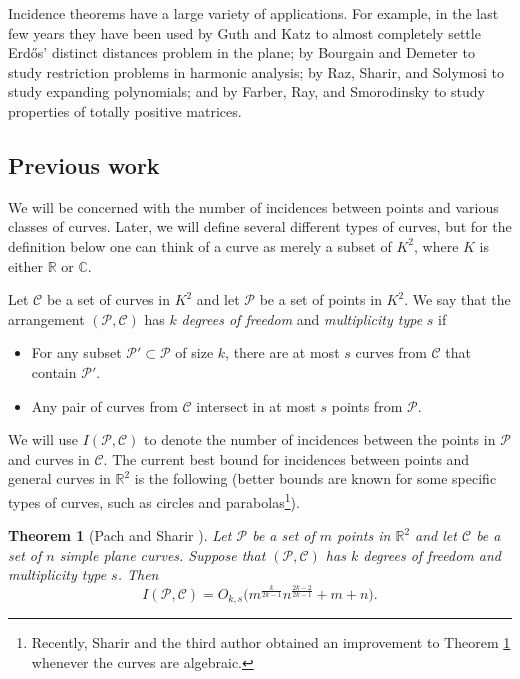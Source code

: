 \documentclass[letterpaper, reqno,11pt]{article}
\newtheorem{theorem}{Theorem}[section]
\theoremstyle{remark}
\newcommand{\RR}{\mathbb{R}}
\newcommand{\CC}{\mathbb{C}}
\newcommand{\pts}{\mathcal P}
\newcommand{\curves}{\mathcal C}
\begin{document}
Incidence theorems have a large variety of applications. For example, in the last few years they have been used by Guth and Katz \cite{Guth} to almost completely settle Erd\H os' distinct distances problem in the plane; by Bourgain and Demeter \cite{BD13,BD14} to study restriction problems in harmonic analysis; by Raz, Sharir, and Solymosi \cite{RSS14} to study expanding polynomials; and by Farber, Ray, and Smorodinsky \cite{FRS13} to study properties of totally positive matrices.

\subsection{Previous work}
We will be concerned with the number of incidences between points and various classes of curves. Later, we will define several different types of curves, but for the definition below one can think of a curve as merely a subset of $K^2$, where $K$ is either $\RR$ or $\CC$.

Let $\mathcal{C}$ be a set of curves in $K^2$ and let $\pts$ be a set of points in $K^2$. We say that the arrangement $(\pts,\mathcal{C})$ has $k$ \emph{degrees of freedom} and \emph{multiplicity type} $s$ if
\begin{itemize}
 \item For any subset $\pts'\subset\pts$ of size $k$, there are at most $s$ curves from $\curves$ that contain $\pts'$.
 \item Any pair of curves from $\curves$ intersect in at most $s$ points from $\pts$.
\end{itemize}

We will use $I(\pts,\curves)$ to denote the number of incidences between the points in $\pts$ and curves in $\curves$.
The current best bound for incidences between points and general curves in $\RR^2$ is the following (better bounds are known for some specific types of curves, such as circles and parabolas\footnote{Recently, Sharir and the third author obtained an improvement \cite{SZ} to Theorem \ref{th:PS} whenever the curves are algebraic.}).

\begin{theorem}[Pach and Sharir \cite{PS}] \label{th:PS}
Let $\pts$ be a set of $m$ points in $\RR^2$ and let $\curves$ be a set of $n$ simple plane curves. Suppose that $(\pts,\curves)$ has $k$ degrees of freedom and multiplicity type $s$. Then
\begin{equation*}
I(\pts,\curves) = O_{k,s}\big(m^{\frac{k}{2k-1}}n^{\frac{2k-2}{2k-1}}+m+n\big).
\end{equation*}
\end{theorem}
\end{document}
